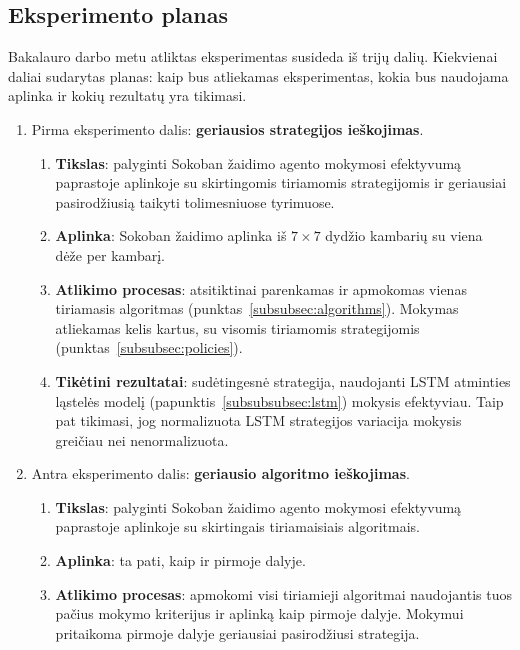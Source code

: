 \documentclass{VUMIFPSbakalaurinis}
\begin{document}
\subsection{Eksperimento planas}\label{subsubsec:plan}
{
	Bakalauro darbo metu atliktas eksperimentas susideda iš trijų dalių. Kiekvienai daliai sudarytas planas: kaip bus atliekamas eksperimentas, kokia bus naudojama aplinka ir kokių rezultatų yra tikimasi.
	\begin{enumerate}
		\item Pirma eksperimento dalis: \textbf{geriausios strategijos ieškojimas}.
		\begin{enumerate}
			\item \textbf{Tikslas}: palyginti Sokoban žaidimo agento mokymosi efektyvumą paprastoje aplinkoje su skirtingomis tiriamomis strategijomis ir geriausiai pasirodžiusią taikyti tolimesniuose tyrimuose. 
			
			\item \textbf{Aplinka}: Sokoban žaidimo aplinka iš \(7 \times 7\) dydžio kambarių su viena dėže per kambarį. 
			
			\item \textbf{Atlikimo procesas}: atsitiktinai parenkamas ir apmokomas vienas tiriamasis algoritmas (punktas~\ref{subsubsec:algorithms}). Mokymas atliekamas kelis kartus, su visomis tiriamomis strategijomis (punktas~\ref{subsubsec:policies}).
			
			\item \textbf{Tikėtini rezultatai}: sudėtingesnė strategija, naudojanti LSTM atminties ląstelės modelį (papunktis~\ref{subsubsubsec:lstm}) mokysis efektyviau. Taip pat tikimasi, jog normalizuota LSTM strategijos variacija mokysis greičiau nei nenormalizuota.
		\end{enumerate}

		\item Antra eksperimento dalis: \textbf{geriausio algoritmo ieškojimas}.
		\begin{enumerate}
			\item \textbf{Tikslas}: palyginti Sokoban žaidimo agento mokymosi efektyvumą paprastoje aplinkoje su skirtingais tiriamaisiais algoritmais.
			
			\item \textbf{Aplinka}: ta pati, kaip ir pirmoje dalyje.
			
			\item \textbf{Atlikimo procesas}: apmokomi visi tiriamieji algoritmai naudojantis tuos pačius mokymo kriterijus ir aplinką kaip pirmoje dalyje. Mokymui pritaikoma pirmoje dalyje geriausiai pasirodžiusi strategija.
			

\end{enumerate}
\end{enumerate}}
\end{document}
